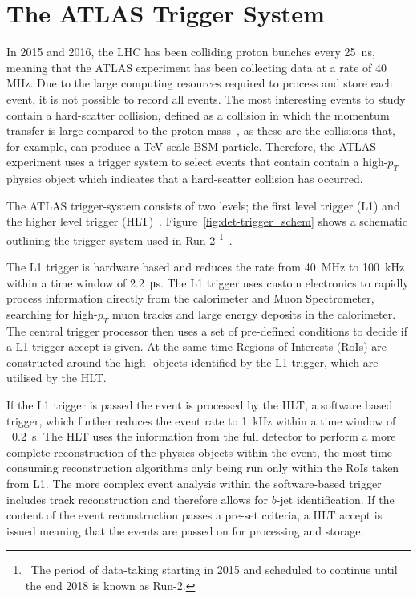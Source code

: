 \chapter{The ATLAS Trigger System}
\label{sec:trig}

In 2015 and 2016, the LHC has been colliding proton bunches every \SI{25}{\nano\second},
meaning that the ATLAS experiment has been collecting data at a rate of 40 MHz.
Due to the large computing resources required to process and store each event,
it is not possible to record all events.
The most interesting events to study contain a hard-scatter collision,
defined as a collision in which the momentum transfer is large compared to the proton mass~\cite{trig-hard_scatter},
as these are the collisions that, for example, can produce a TeV scale BSM particle.
Therefore, the ATLAS experiment uses a trigger system to select events that contain
contain a high-$p_{T}$ physics object which indicates that a hard-scatter collision has occurred.

The ATLAS trigger-system consists of two levels;
the first level trigger (L1) and the higher level trigger (HLT)~\cite{det-run2_trigger}.
Figure~\ref{fig:det-trigger_schem} shows a schematic outlining the trigger system used in Run-2
\footnote{\ The period of data-taking starting in 2015 and scheduled to continue until the end 2018 is known as Run-2.}~\cite{det-run2_triggerPerf}. 

The L1 trigger is hardware based and reduces the rate from 40~MHz to 100~kHz within a time window of \SI{2.2}{\micro\second}.
The L1 trigger uses custom electronics to rapidly process information directly from the
calorimeter and Muon Spectrometer, searching for high-$p_{T}$ muon tracks and large energy deposits in the calorimeter.
The central trigger processor then uses a set of pre-defined conditions
to decide if a L1 trigger accept is given. 
At the same time Regions of Interests (RoIs) are constructed around the high-\pT{} objects identified by the L1 trigger, which are utilised by the HLT. 

If the L1 trigger is passed the event is processed by the HLT,
a software based trigger,
which further reduces the event rate to 1~kHz within a time window of ~\SI{0.2}{\second}.
The HLT uses the information from the full detector
to perform a more complete reconstruction of the physics objects within the event,
the most time consuming reconstruction algorithms only being run only within the RoIs taken from L1.
The more complex event analysis within the software-based trigger includes
track reconstruction and therefore allows for $b$-jet identification.
If the content of the event reconstruction passes a pre-set criteria, a HLT accept is issued
meaning that the events are passed on for processing and storage. 

